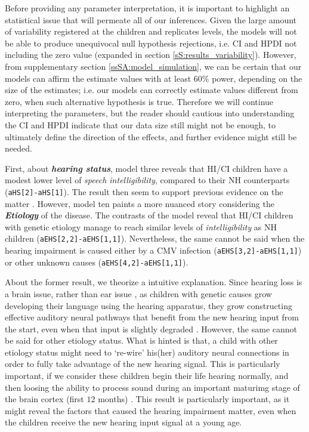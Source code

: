 Before providing any parameter interpretation, it is important to highlight an statistical issue that will permeate all of our inferences. Given the large amount of variability registered at the children and replicates levels, the models will not be able to produce unequivocal null hypothesis rejections, i.e. CI and HPDI not including the zero value (expanded in section \ref{sS:results_variability}). However, from supplementary section \ref{ssSA:model_simulation}, we can be certain that our models can affirm the estimate values with at least $60\%$ power, depending on the size of the estimates; i.e. our models can correctly estimate values different from zero, when such alternative hypothesis is true. Therefore we will continue interpreting the parameters, but the reader should cautious into understanding the CI and HPDI indicate that our data size still might not be enough, to ultimately define the direction of the effects, and further evidence might still be needed.

First, about \textbf{\textit{hearing status}}, model three reveals that HI/CI children have a modest lower level of \textit{speech intelligibility}, compared to their NH counterparts (\texttt{aHS[2]-aHS[1]}). The result then seem to support previous evidence on the matter \cite{Nicholas_et_al_2007, Castellanos_et_al_2014, Chin_et_al_2014, Geers_et_al_2016, Freeman_et_al_2017, Duchesne_et_al_2019, Grandon_et_al_2020}. However, model ten paints a more nuanced story considering the \textbf{\textit{Etiology}} of the disease. The contrasts of the model reveal that HI/CI children with genetic etiology manage to reach similar levels of \textit{intelligibility} as NH children (\texttt{aEHS[2,2]-aEHS[1,1]}). Nevertheless, the same cannot be said when the hearing impairment is caused either by a CMV infection (\texttt{aEHS[3,2]-aEHS[1,1]}) or other unknown causes (\texttt{aEHS[4,2]-aEHS[1,1]}).

About the former result, we theorize a intuitive explanation. Since hearing loss is a brain issue, rather than ear issue \cite{Flexer_2011}, as children with genetic causes grow developing their language using the hearing apparatus, they grow constructing effective auditory neural pathways that benefit from the new hearing input from the start, even when that input is slightly degraded \cite{Drennan_et_al_2008}. However, the same cannot be said for other etiology status. What is hinted is that, a child with other etiology status might need to `re-wire' his(her) auditory neural connections in order to fully take advantage of the new hearing signal. This is particularly important, if we consider these children begin their life hearing normally, and then loosing the ability to process sound during an important maturimg stage of the brain cortex (first $12$ months) \cite{Flexer_2011}. This result is particularly important, as it might reveal the factors that caused the hearing impairment matter, even when the children receive the new hearing input signal at a young age.

